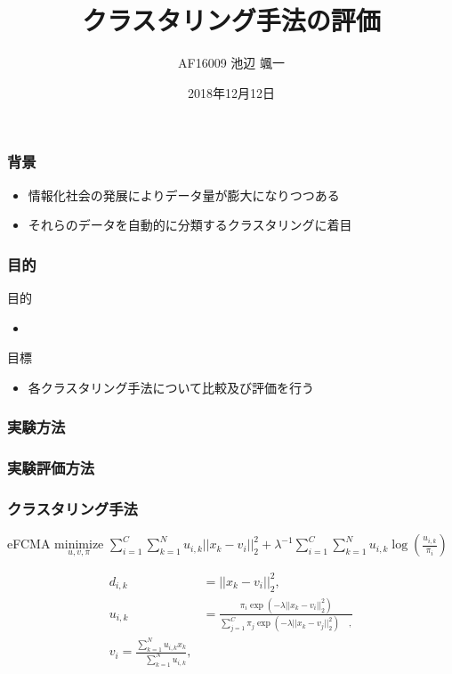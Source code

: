 \documentclass[13pt,dvipdfmx]{beamer}
\title{クラスタリング手法の評価}
\author{AF16009 池辺 颯一}
\institute{SIT}
\date{2018年12月12日}
\begin{document}
\begin{frame}\frametitle{}
 \titlepage
\end{frame}

\begin{frame}\frametitle{背景}
\begin{itemize}
 \item 情報化社会の発展によりデータ量が膨大になりつつある
 \item それらのデータを自動的に分類するクラスタリングに着目
\end{itemize}
\end{frame}

\begin{frame}\frametitle{目的}
\begin{block}{目的}
\begin{itemize}
 \item 
\end{itemize}
\end{block}
\vspace{4mm}
\begin{block}{目標}
\begin{itemize}
 \item 各クラスタリング手法について比較及び評価を行う
\end{itemize}
\end{block}
\end{frame}

\begin{frame}\frametitle{実験方法}
\begin{center}
\end{center}
\end{frame}

\begin{frame}\frametitle{実験評価方法}
\begin{center}
\end{center}
\end{frame}

\begin{frame}\frametitle{\Large クラスタリング手法}
 \begin{block}{eFCMA}
  $\underset{u,v,\pi}{\text{minimize}}$
  $\sum_{i=1}^C\sum_{k=1}^Nu_{i,k}||x_k-v_i||_2^2+\lambda^{-1}\sum_{i=1}^C\sum_{k=1}^Nu_{i,k}\log(\frac{u_{i,k}}{\pi_{i}})$\centering\\
 \end{block}
\begin{align*}
 d_{i,k}&=||x_{k}-v_{i}||_{2}^2, \\
 u_{i,k}&=\frac{\pi_{i}\exp(-\lambda||x_k-v_i||_2^2)}{\sum_{j=1}^C\pi_{j}\exp(-\lambda||x_k-v_j||_2^2)\quad,}\\
 v_{i}=\frac{\sum_{k=1}^Nu_{i,k}x_{k}}{\quad\sum_{k=1}^Nu_{i,k}},
\end{align*}
\end{frame}
\end{document}
